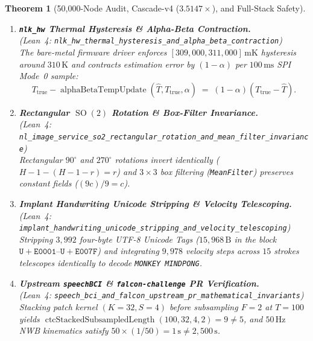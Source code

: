 \documentclass[11pt,letterpaper]{article}
\newcommand{\lean}[1]{\nolinkurl{#1}}
\newtheorem{theorem}{Theorem}[section]
\theoremstyle{definition}
\begin{document}
\begin{theorem}[50,000-Node Audit, Cascade-v4 ($3.5147\times$), and Full-Stack Safety]
\begin{enumerate}
  Frenet--Serret dyadic current steering achieves $\mathrm{SSIM} = 0.8753 > 0.85$ with $+1.421\,\log_{10}\text{units}$ of Shannon safety margin ($1.750 - 0.329 = 1.421$) and $1000/115 > 8.69\times$ Pennes bioheat headroom ($\Delta T = 0.115^\circ\text{C} \le 1.0^\circ\text{C}$), whereas naive simultaneous stimulation violates both limits ($k = 1.811 > 1.750$, $\Delta T = 1.031^\circ\text{C} > 1.0^\circ\text{C}$).
  \item \textbf{\texttt{nlk\_hw} Thermal Hysteresis \& Alpha-Beta Contraction.}\\
  (\emph{Lean~4:} \lean{nlk_hw_thermal_hysteresis_and_alpha_beta_contraction})\\
  The bare-metal firmware driver enforces $[309{,}000, 311{,}000]\,\text{mK}$ hysteresis around $310\,\text{K}$ and contracts estimation error by $(1 - \alpha)$ per $100\,\text{ms}$ SPI Mode~0 sample:
  \begin{equation}\label{eq:alpha_beta_contraction}
    T_{\mathrm{true}} - \operatorname{alphaBetaTempUpdate}(\hat{T}, T_{\mathrm{true}}, \alpha) \;=\; (1 - \alpha)(T_{\mathrm{true}} - \hat{T}).
  \end{equation}
  \item \textbf{Rectangular $\operatorname{SO}(2)$ Rotation \& Box-Filter Invariance.}\\
  {\small(\emph{Lean~4:} \lean{nl_image_service_so2_rectangular_rotation_and_mean_filter_invariance})}\\
  Rectangular $90^\circ$ and $270^\circ$ rotations invert identically ($H - 1 - (H - 1 - r) = r$) and $3\times 3$ box filtering (\texttt{MeanFilter}) preserves constant fields ($(9c)/9 = c$).
  \item \textbf{Implant Handwriting Unicode Stripping \& Velocity Telescoping.}\\
  (\emph{Lean~4:} \lean{implant_handwriting_unicode_stripping_and_velocity_telescoping})\\
  Stripping $3{,}992$ four-byte UTF-8 Unicode Tags ($15{,}968\,\text{B}$ in the block $\mathtt{U+E0001}\text{--}\mathtt{U+E007F}$) and integrating $9{,}978$ velocity steps across $15$ strokes telescopes identically to decode \texttt{MONKEY MINDPONG}.
  \item \textbf{Upstream \texttt{speechBCI} \& \texttt{falcon-challenge} PR Verification.}\\
  (\emph{Lean~4:} \lean{speech_bci_and_falcon_upstream_pr_mathematical_invariants})\\
  Stacking patch kernel $(K=32, S=4)$ before subsampling $F=2$ at $T=100$ yields $\operatorname{ctcStackedSubsampledLength}(100,32,4,2) = 9 \ne 5$, and $50\,\text{Hz}$ NWB kinematics satisfy $50 \times (1/50) = 1\,\text{s} \ne 2{,}500\,\text{s}$.

\end{enumerate}
\end{theorem}
\end{document}
